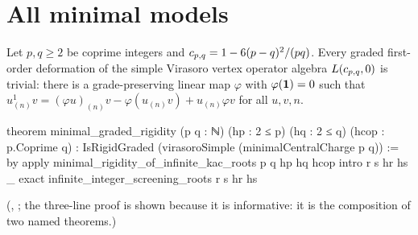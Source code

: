 \section{All minimal models}\label{l07:sec:all}

\begin{theorem}\label{l07:thm:main}
Let $p,q\ge2$ be coprime integers and $c_{p,q} = 1-6(p-q)^2/(pq)$. Every graded first-order deformation of
the simple Virasoro vertex operator algebra $L(c_{p,q},0)$ is trivial: there is a grade-preserving linear map
$\varphi$ with $\varphi(\mathbf{1}) = 0$ such that $u^1_{(n)}v = (\varphi u)_{(n)}v - \varphi(u_{(n)}v) + u_{(n)}\varphi v$ for all
$u,v,n$.
\end{theorem}
\begin{leancode}
theorem minimal_graded_rigidity (p q : ℕ) (hp : 2 ≤ p) (hq : 2 ≤ q)
    (hcop : p.Coprime q) :
    IsRigidGraded (virasoroSimple (minimalCentralCharge p q)) := by
  apply minimal_rigidity_of_infinite_kac_roots p q hp hq hcop
  intro r s hr hs _
  exact infinite_integer_screening_roots r s hr hs
\end{leancode}
(, ;
the three-line proof is shown because it is informative: it is the composition of two named theorems.)

